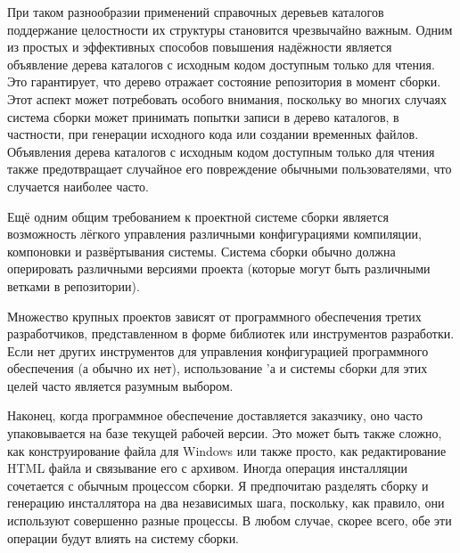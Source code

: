 При таком разнообразии применений справочных деревьев каталогов
поддержание целостности их структуры становится чрезвычайно важным.
Одним из простых и эффективных способов повышения надёжности является
объявление дерева каталогов с исходным кодом доступным только для
чтения. Это гарантирует, что дерево отражает состояние репозитория в
момент сборки. Этот аспект может потребовать особого внимания,
поскольку во многих случаях система сборки может принимать попытки
записи в дерево каталогов, в частности, при генерации исходного кода
или создании временных файлов. Объявления дерева каталогов с исходным
кодом доступным только для чтения также предотвращает случайное его
повреждение обычными пользователями, что случается наиболее
часто.

Ещё одним общим требованием к проектной системе сборки является
возможность лёгкого управления различными конфигурациями компиляции,
компоновки и развёртывания системы. Система сборки обычно должна
оперировать различными версиями проекта (которые могут быть различными
ветками в репозитории).

Множество крупных проектов зависят от программного обеспечения третих
разработчиков, представленном в форме библиотек или инструментов
разработки. Если нет других инструментов для управления конфигурацией
программного обеспечения (а обычно их нет), использование
\Makefile{}'а и системы сборки для этих целей часто является разумным
выбором.

Наконец, когда программное обеспечение доставляется заказчику, оно часто
упаковывается на базе текущей рабочей версии. Это может быть также
сложно, как конструирование  файла для Windows или
также просто, как редактирование HTML файла и связывание его с
 архивом. Иногда операция инсталляции сочетается с
обычным процессом сборки. Я предпочитаю разделять сборку и генерацию
инсталлятора на два независимых шага, поскольку, как правило, они
используют совершенно разные процессы. В любом случае, скорее всего,
обе эти операции будут влиять на систему сборки.

